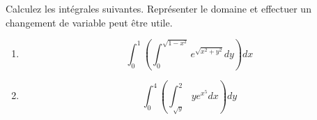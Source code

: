 
\begin{exercice}\label{exoIntMult0009}

Calculez les intégrales suivantes. Représenter le domaine et effectuer un changement de variable peut \^etre utile.
\begin{enumerate}
\item
\begin{equation}
	\int_0^1 (\int_0^{\sqrt{1-x^2}} e^{\sqrt{x^2+y^2}} dy) dx
\end{equation}

\item 
\begin{equation}
	\int_0^4(\int_{\sqrt{y}}^2 ye^{x^5}dx) dy
\end{equation}
\end{enumerate}


\end{exercice}

